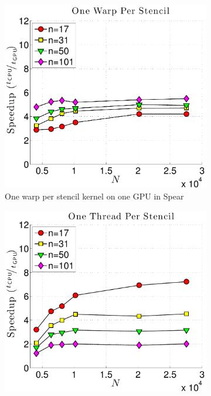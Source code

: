 \begin{figure}[htbp]
\begin{subfigure}[b]{0.425\textwidth}
\includegraphics[width=1.0\textwidth]{../figures/spear_results/vortex/speedup_1proc_oneWarpPerStencil-eps-converted-to.pdf}
\caption{One warp per stencil kernel on one GPU in Spear}
\label{fig:alltoall_1proc_warp}
\end{subfigure} 
\begin{subfigure}[b]{0.425\textwidth}
\includegraphics[width=1.0\textwidth]{../figures/spear_results/vortex/speedup_1proc_oneThreadPerStencil-eps-converted-to.pdf}

\end{subfigure}
\end{figure}

